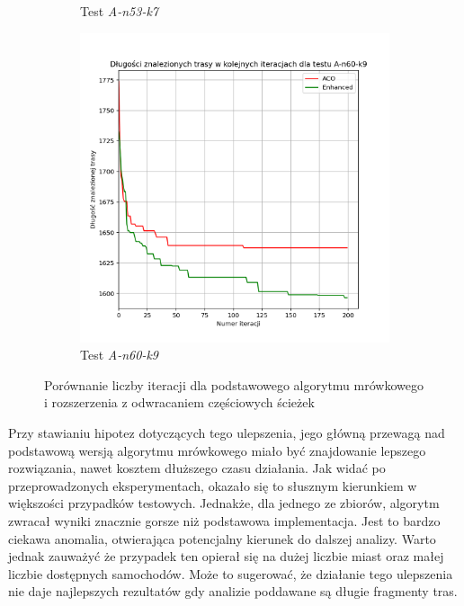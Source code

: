 \documentclass[10pt]{article}
\begin{document}
\begin{figure}[H]
\begin{subfigure}[b]{0.4\textwidth}
         \caption{Test \textit{A-n53-k7}}
     \end{subfigure}
     \hfill
     \begin{subfigure}[b]{0.4\textwidth}
         \centering
         \includegraphics[width=\textwidth]{iterations_enhanced_5.png}
         \caption{Test \textit{A-n60-k9}}
     \end{subfigure}
    \caption{Porównanie liczby iteracji dla podstawowego algorytmu mrówkowego i rozszerzenia z odwracaniem częściowych ścieżek}
    \label{fig:iterations_enhanced}
\end{figure}

Przy stawianiu hipotez dotyczących tego ulepszenia, jego główną przewagą nad podstawową wersją algorytmu mrówkowego miało być znajdowanie lepszego rozwiązania, nawet kosztem dłuższego czasu działania. Jak widać po przeprowadzonych eksperymentach, okazało się to słusznym kierunkiem w większości przypadków testowych. Jednakże, dla jednego ze zbiorów, algorytm zwracał wyniki znacznie gorsze niż podstawowa implementacja. Jest to bardzo ciekawa anomalia, otwierająca potencjalny kierunek do dalszej analizy. Warto jednak zauważyć że przypadek ten opierał się na dużej liczbie miast oraz małej liczbie dostępnych samochodów. Może to sugerować, że działanie tego ulepszenia nie daje najlepszych rezultatów gdy analizie poddawane są długie fragmenty tras.
\end{document}
